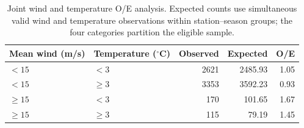 \begin{table}[htbp]
\centering
\small
\caption[Joint wind and temperature O/E analysis.]{Joint wind and temperature O/E analysis. Expected counts use simultaneous valid wind and temperature observations within station--season groups; the four categories partition the eligible sample.}
\label{tab:joint-weather-oe}
\begin{tabular}{llrrr}
\toprule
Mean wind (m/s) & Temperature ($^{\circ}$C) & Observed & Expected & O/E \\
\midrule
$<15$ & $<3$ & 2621 & 2485.93 & 1.05 \\ \grayhline
$<15$ & $\geq3$ & 3353 & 3592.23 & 0.93 \\ \grayhline
$\geq15$ & $<3$ & 170 & 101.65 & 1.67 \\ \grayhline
$\geq15$ & $\geq3$ & 115 & 79.19 & 1.45 \\
\bottomrule
\end{tabular}
\end{table}
